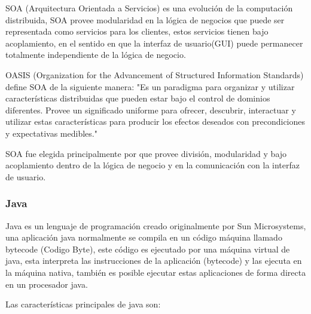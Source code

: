 SOA (Arquitectura Orientada a Servicios) es una evolución de la computación distribuida, SOA provee modularidad en la lógica de negocios que puede ser representada como servicios para los clientes, estos servicios tienen bajo acoplamiento, en el sentido en que la interfaz de usuario(GUI) puede permanecer totalmente independiente de la lógica de negocio.

OASIS (Organization for the Advancement of Structured Information Standards) define SOA de la siguiente manera: "Es un paradigma para organizar y utilizar características distribuidas que pueden estar bajo el control de dominios diferentes. Provee un significado uniforme para ofrecer, descubrir, interactuar y utilizar estas características para producir los efectos deseados con precondiciones y expectativas medibles."

SOA fue elegida principalmente por que provee división, modularidad y bajo acoplamiento dentro de la lógica de negocio y en la comunicación con la interfaz de usuario.


\subsubsection*{Java \cite{java} }
\label{tec:java}

Java es un lenguaje de programación creado originalmente por Sun Microsystems, una aplicación java normalmente se compila en un código máquina llamado bytecode (Codigo Byte), este código es ejecutado por una máquina virtual de java, esta interpreta las instrucciones de la aplicación (bytecode) y las ejecuta en la máquina nativa, también es posible ejecutar estas aplicaciones de forma directa en un procesador java.

Las características \cite{java_caracteristicas} principales de java son:


